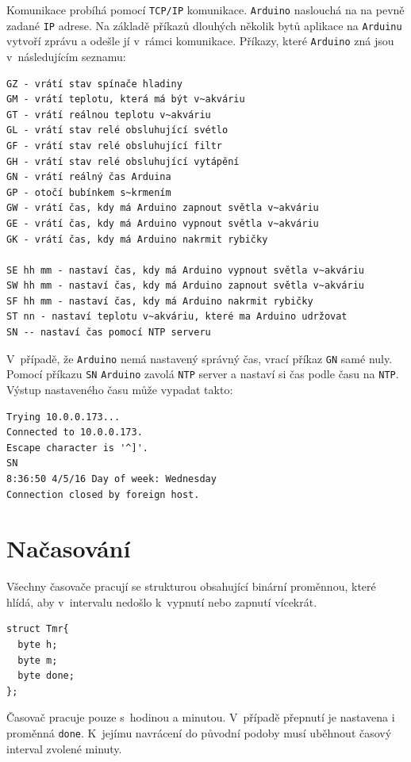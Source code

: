 \documentclass[a4paper,10pt]{article}
\newcommand{\ttt}[1]{\texttt{#1}}
\begin{document}
Komunikace probíhá pomocí \ttt{TCP/IP} komunikace. \ttt{Arduino} naslouchá na na pevně zadané \ttt{IP} adrese. Na základě příkazů dlouhých několik bytů aplikace na \ttt{Arduinu} vytvoří zprávu a odešle jí v~rámci komunikace. Příkazy, které \ttt{Arduino} zná jsou v~následujícím seznamu:

\begin{verbatim}
GZ - vrátí stav spínače hladiny
GM - vrátí teplotu, která má být v~akváriu
GT - vrátí reálnou teplotu v~akváriu
GL - vrátí stav relé obsluhující svétlo
GF - vrátí stav relé obsluhující filtr
GH - vrátí stav relé obsluhující vytápění
GN - vrátí reálný čas Arduina
GP - otočí bubínkem s~krmením
GW - vrátí čas, kdy má Arduino zapnout světla v~akváriu
GE - vrátí čas, kdy má Arduino vypnout světla v~akváriu
GK - vrátí čas, kdy má Arduino nakrmit rybičky

SE hh mm - nastaví čas, kdy má Arduino vypnout světla v~akváriu
SW hh mm - nastaví čas, kdy má Arduino zapnout světla v~akváriu
SF hh mm - nastaví čas, kdy má Arduino nakrmit rybičky
ST nn - nastaví teplotu v~akváriu, které ma Arduino udržovat
SN -- nastaví čas pomocí NTP serveru
\end{verbatim}

V~případě, že \ttt{Arduino} nemá nastavený správný čas, vrací příkaz \ttt{GN} samé nuly. Pomocí příkazu \ttt{SN} \ttt{Arduino} zavolá \ttt{NTP} server a nastaví si čas podle času na \ttt{NTP}. Výstup nastaveného času může vypadat takto:

\begin{verbatim}
Trying 10.0.0.173...
Connected to 10.0.0.173.
Escape character is '^]'.
SN
8:36:50 4/5/16 Day of week: Wednesday
Connection closed by foreign host.
\end{verbatim}

\section{Načasování}

Všechny časovače pracují se strukturou obsahující binární proměnnou, které hlídá, aby v~intervalu nedošlo k~vypnutí nebo zapnutí vícekrát. 

\begin{verbatim}
struct Tmr{
  byte h;
  byte m;
  byte done;
};
\end{verbatim}

Časovač pracuje pouze s~hodinou a minutou. V~případě přepnutí je nastavena i proměnná \ttt{done}. K~jejímu navrácení do původní podoby musí uběhnout časový interval zvolené minuty.
\end{document}

